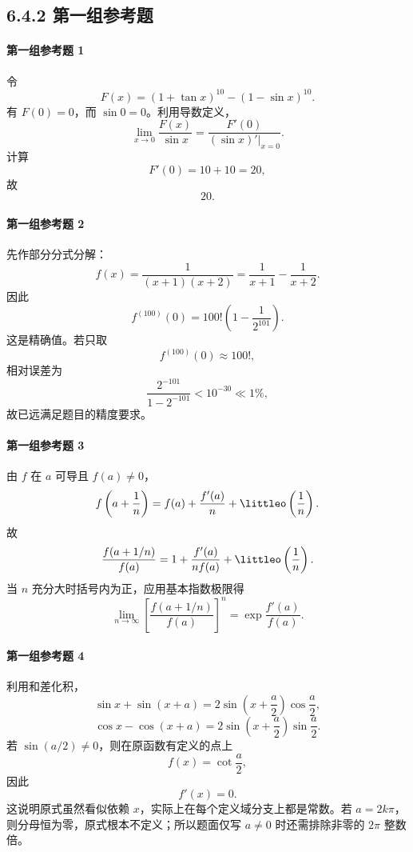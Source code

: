 \subsection*{6.4.2 第一组参考题}

\paragraph{第一组参考题 1}
\begin{xsolution}
令
\[
  F(x)=(1+\tan x)^{10}-(1-\sin x)^{10}.
\]
有 $F(0)=0$，而 $\sin0=0$。利用导数定义，
\[
  \lim_{x\to0}\frac{F(x)}{\sin x}
  =\frac{F'(0)}{(\sin x)'\rvert_{x=0}}.
\]
计算
\[
  F'(0)=10+10=20,
\]
故
\[
  \boxed{20}.
\]
\end{xsolution}

\paragraph{第一组参考题 2}
\begin{xsolution}
先作部分分式分解：
\[
  f(x)=\frac1{(x+1)(x+2)}=\frac1{x+1}-\frac1{x+2}.
\]
因此
\[
  f^{(100)}(0)
  =100!\left(1-\frac1{2^{101}}\right).
\]
这是精确值。若只取
\[
  f^{(100)}(0)\approx100!,
\]
相对误差为
\[
  \frac{2^{-101}}{1-2^{-101}}<10^{-30}\ll1\%,
\]
故已远满足题目的精度要求。
\end{xsolution}

\paragraph{第一组参考题 3}
\begin{xsolution}
由 $f$ 在 $a$ 可导且 $f(a)\ne0$，
\[
  f\left(a+\frac1n\right)
  =f(a)+\frac{f'(a)}n+\littleo\left(\frac1n\right).
\]
故
\[
  \frac{f(a+1/n)}{f(a)}
  =1+\frac{f'(a)}{nf(a)}+\littleo\left(\frac1n\right).
\]
当 $n$ 充分大时括号内为正，应用基本指数极限得
\[
  \boxed{
  \lim_{n\to\infty}\left[\frac{f(a+1/n)}{f(a)}\right]^n
  =\exp\frac{f'(a)}{f(a)}}.
\]
\end{xsolution}

\paragraph{第一组参考题 4}
\begin{xsolution}
利用和差化积，
\[
  \sin x+\sin(x+a)=2\sin\left(x+\frac a2\right)\cos\frac a2,
\]
\[
  \cos x-\cos(x+a)=2\sin\left(x+\frac a2\right)\sin\frac a2.
\]
若 $\sin(a/2)\ne0$，则在原函数有定义的点上
\[
  f(x)=\cot\frac a2,
\]
因此
\[
  \boxed{f'(x)=0}.
\]
这说明原式虽然看似依赖 $x$，实际上在每个定义域分支上都是常数。若 $a=2k\pi$，则分母恒为零，原式根本不定义；所以题面仅写 $a\ne0$ 时还需排除非零的 $2\pi$ 整数倍。
\end{xsolution}


